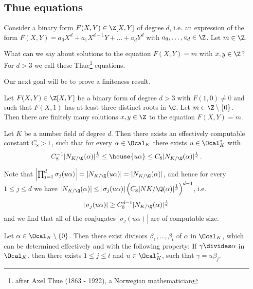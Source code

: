 \subsection*{Thue equations}

Consider a binary form \( F(X,Y) \in \Z[X,Y] \) of degree \( d \), i.e. an expression of the form \( F(X,Y) = a_0 X^d + a_1 X^{d-1}Y + \dots + a_d Y^d \) with \( a_0, \dotsc, a_d \in \Z \).
Let \( m \in \Z \).

\begin{frage*}
	What can we say about solutions to the equation \( F(X,Y) = m \) with \( x,y \in \Z \)?
	For \( d > 3 \) we call these Thue\footnote{after Axel Thue (1863 - 1922), a Norwegian mathematician} equations.
\end{frage*}

Our next goal will be to prove a finiteness result.

\begin{thm}\label{thm:5.7}
	Let \( F(X,Y) \in \Z[X,Y] \) be a binary form of degree \( d>3 \) with \( F(1,0) \neq 0 \) and such that \( F(X,1) \) has at least three distinct roots in \( \C \).
	Let \( m \in \Z \setminus \{0\} \).
	Then there are finitely many solutions \( x,y \in \Z \) to the equation \( F(X,Y) = m \).
\end{thm}

\begin{lem}
	Let \( K \) be a number field of degree \( d \).
	Then there exists an effectively computable constant \( C_8 > 1 \), such that for every \( \alpha \in \Ocal_K \) there exists \( u \in \Ocal_K^* \) with
	\[ C_8^{-1} |N_{K/\Q}(\alpha)|^\frac{1}{d} \leq \house{u \alpha} \leq C_8 |N_{K/\Q}(\alpha)|^\frac{1}{d} \,. \]
\end{lem}

\begin{rem*}
	Note that \( \left| \prod_{j=1}^{d} \sigma_j (u\alpha) \right| = |N_{K/\Q}(u\alpha)| = |N_{K/\Q}(\alpha)| \), and hence for every \( 1 \leq j \leq d \) we have \( |N_{K/\Q}(\alpha)| \leq |\sigma_j(u\alpha)| \left(C_8 |N{K/\Q}(\alpha)|^\frac{1}{d} \right)^{d-1} \), i.e.
	\[ |\sigma_j(u\alpha)| \geq C_8^{d-1} |N_{K/\Q}(\alpha)|^\frac{1}{d} \]
	and we find that all of the conjugates \( |\sigma_j(u\alpha)| \) are of computable size.
\end{rem*}

\begin{lem}
	Let \( \alpha \in \Ocal_K \setminus \{0\} \).
	Then there exist divisors \( \beta_1, \dotsc, \beta_t \) of \( \alpha \) in \( \Ocal_K \), which can be determined effectively and with the following property:
	If \( \gamma \divides \alpha \) in \( \Ocal_K \), then there exists \( 1 \leq j \leq t \) and \( u \in \Ocal_K^* \), such that \( \gamma = u \beta_j \).
\end{lem}

